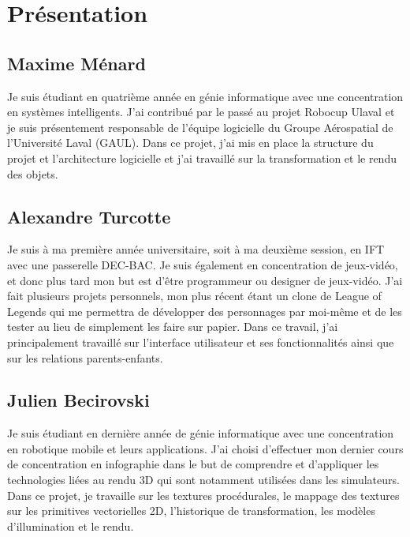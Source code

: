 \section{Présentation}
\label{s:présentation}

\subsection{Maxime Ménard}
Je suis étudiant en quatrième année en génie informatique avec une concentration en systèmes intelligents.
J'ai contribué par le passé au projet Robocup Ulaval et je suis présentement responsable de l'équipe logicielle du Groupe Aérospatial de l'Université Laval (GAUL).
Dans ce projet, j'ai mis en place la structure du projet et l'architecture logicielle et j'ai travaillé sur la transformation et le rendu des objets.

\subsection{Alexandre Turcotte}
Je suis à ma première année universitaire, soit à ma deuxième session, en IFT avec une passerelle DEC-BAC.
Je suis également en concentration de jeux-vidéo, et donc plus tard mon but est d’être programmeur ou designer de jeux-vidéo.
J’ai fait plusieurs projets personnels, mon plus récent étant un clone de League of Legends qui me permettra de développer des personnages par moi-même et de les tester au lieu de simplement les faire sur papier.
Dans ce travail, j’ai principalement travaillé sur l’interface utilisateur et ses fonctionnalités ainsi que sur les relations parents-enfants.

\subsection{Julien Becirovski}
Je suis étudiant en dernière année de génie informatique avec une concentration en robotique mobile et leurs applications. J'ai choisi d'effectuer mon dernier cours de concentration en infographie dans le but de comprendre et d'appliquer les technologies liées au rendu 3D qui sont notamment utilisées dans les simulateurs. Dans ce projet, je travaille sur les textures procédurales, le mappage des textures sur les primitives vectorielles 2D, l'historique de transformation, les modèles d'illumination et le rendu.